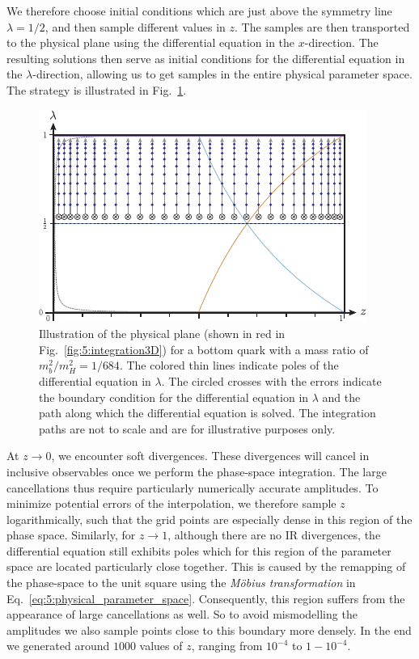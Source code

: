 We therefore choose initial conditions which are just above the symmetry line $\lambda = 1/2$, and then sample different values in $z$. The samples are then transported to the physical plane using the differential equation in the $x$-direction. The resulting solutions then serve as initial conditions for the differential equation in the $\lambda$-direction, allowing us to get samples in the entire physical parameter space. The strategy is illustrated in Fig.~\ref{fig:5:integration2D}.
\begin{figure}
\centering
\includegraphics[width=\figurewidth]{Images/integration_Z_LA_with_poles_mb2_with_contour.pdf}
\caption{Illustration of the physical plane (shown in red in Fig.~\ref{fig:5:integration3D}) for a bottom quark with a mass ratio of $m_b^2/m_H^2 = 1/684$. The colored thin lines indicate poles of the differential equation in $\lambda$. The circled crosses with the errors indicate the boundary condition for the differential equation in $\lambda$ and the path along which the differential equation is solved. The integration paths are not to scale and are for illustrative purposes only.}
\label{fig:5:integration2D}
\end{figure}

At $z \rightarrow 0$, we encounter soft divergences. These divergences will cancel in inclusive observables once we perform the phase-space integration. The large cancellations thus require particularly numerically accurate amplitudes. To minimize potential errors of the interpolation, we therefore sample $z$ logarithmically, such that the grid points are especially dense in this region of the phase space. Similarly, for $z \rightarrow 1$, although there are no \acs{IR} divergences, the differential equation still exhibits poles which for this region of the parameter space are located particularly close together. This is caused by the remapping of the phase-space to the unit square using the \textit{M\"obius transformation} in Eq.~\eqref{eq:5:physical_parameter_space}. Consequently, this region suffers from the appearance of large cancellations as well. So to avoid mismodelling the amplitudes we also sample points close to this boundary more densely. In the end we generated around $1000$ values of $z$, ranging from $10^{-4}$ to $1 - 10^{-4}$.

